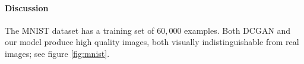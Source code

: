 \paragraph{Discussion}
The MNIST dataset has a training set of $60,000$ examples. 
Both DCGAN and our model produce high quality images, both visually indistinguishable from real images; see figure \ref{fig:mnist}. 


